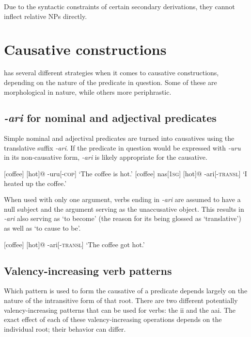 Due to the syntactic constraints of certain secondary derivations, they cannot inflect relative NPs directly.


\section{Causative constructions}

\lang{} has several different strategies when it comes to causative constructions, depending on the nature of the predicate in question. Some of these are morphological in nature, while others more periphrastic. 

\subsection{\textit{-ari} for nominal and adjectival predicates}

Simple nominal and adjectival predicates are turned into causatives using the translative suffix \textit{-ari}. If the predicate in question would be expressed with \textit{-uru} in its non-causative form, \textit{-ari} is likely appropriate for the causative.

\pex
\a
\begingl
{}[coffee]
[hot]@
-uru[\textsc{-cop}]
\glft `The coffee is hot.'
\endgl
\a
\begingl
{}[coffee]
nas[\textsc{1sg}]
[hot]@
-ari[-\textsc{transl}]
\glft `I heated up the coffee.'
\endgl
\xe

When used with only one argument, verbs ending in \textit{-ari} are assumed to have a null subject and the argument serving as the unaccusative object. This results in \textit{-ari} also serving as `to become' (the reason for its being glossed as `translative') as well as `to cause to be'.

\ex
\begingl
{}[coffee]
[hot]@
-ari[\textsc{-transl}]
\glft `The coffee got hot.'
\endgl
\xe

\subsection{Valency-increasing verb patterns}

Which pattern is used to form the causative of a predicate depends largely on the nature of the intransitive form of that root. There are two different potentially valency-increasing patterns that can be used for verbs: the {\rootpart}ii{\rootpart} and the aa{\rootpart}i{\rootpart}. The exact effect of each of these valency-increasing operations depends on the individual root; their behavior can differ.

